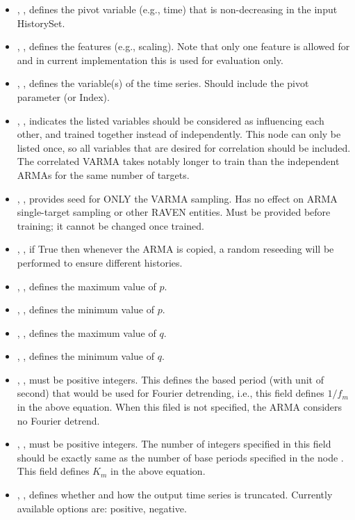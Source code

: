 \begin{itemize}
  \item {}, , defines the pivot variable (e.g., time) that is non-decreasing in
  the input HistorySet.
  \item {}, , defines the features (e.g., scaling). Note that only
  one feature is allowed for  and in current implementation this is used for evaluation only.
  \item {}, , defines the variable(s) of the
    time series.  Should include the pivot parameter (or Index).
  \item {}, , indicates the listed variables
    should be considered as influencing each other, and trained together instead of independently.  This node
    can only be listed once, so all variables that are desired for correlation should be included.  \nb The
    correlated VARMA takes notably longer to train than the independent ARMAs for the same number of targets.
  \item {}, , provides seed for ONLY the VARMA sampling.  Has no
    effect on ARMA single-target sampling or other RAVEN entities.  Must be provided before training; it cannot
    be changed once trained.
  \item {}, , if True then whenever the ARMA is copied, a
    random reseeding will be performed to ensure different histories.
  \item {}, , defines the maximum value of $p$.
  \item {}, , defines the minimum value of $p$.
  \item {}, , defines the maximum value of $q$.
  \item {}, , defines the minimum value of $q$.
  \item {}, , must be positive integers. This defines the based period (with unit of second) that would be used for Fourier detrending, i.e., this field defines $1/f_m$ in the above equation. When this filed is not specified, the ARMA considers no Fourier detrend.
  \item {}, , must be positive integers. The number of integers specified in this field should be exactly same as the number of base periods specified in the node . This field defines $K_m$ in the above equation.
  \item {}, , defines whether and how the output time series is truncated. Currently available options are: positive, negative.
\end{itemize}

